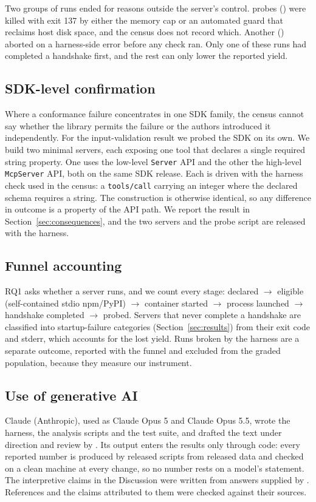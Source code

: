 Two groups of runs ended for reasons outside the server's control. \NKilled{}
probes (\NKilledPct{}) were killed with exit 137 by either the memory cap or an
automated guard that reclaims host disk space, and the census does not record which.
Another \NHarnessError{} (\NHarnessErrorPct{}) aborted on a harness-side error before
any check ran. Only one of these \NInterrupted{} runs had completed a handshake
first, and the rest can only lower the reported yield.

\subsection{SDK-level confirmation}
\label{sec:sdk-probe}
Where a conformance failure concentrates in one SDK family, the census cannot
say whether the library permits the failure or the authors introduced it
independently. For the input-validation result we probed the SDK on its own. We build
two minimal servers, each exposing one tool that declares a single required string
property. One uses the low-level \texttt{Server} API and the other the high-level
\texttt{McpServer} API, both on the same SDK release. Each is driven with the harness
check used in the census: a \texttt{tools/call} carrying an
integer where the declared schema requires a string. The construction is otherwise
identical, so any difference in outcome is a property of the API path. We report the
result in Section~\ref{sec:consequences}, and the two servers and the probe script
are released with the harness.

\subsection{Funnel accounting}
RQ1 asks whether a server runs, and we count every stage:
declared $\rightarrow$ eligible (self-contained stdio npm/PyPI) $\rightarrow$
container started $\rightarrow$ process launched
$\rightarrow$ handshake completed $\rightarrow$ probed. Servers that never complete a
handshake are classified into startup-failure categories
(Section~\ref{sec:results}) from their exit code and stderr, which accounts for the
lost yield.
Runs broken by the harness are a separate outcome, reported with the funnel and
excluded from the graded population, because they measure our instrument.

\subsection{Use of generative AI}\label{sec:genai}
Claude (Anthropic), used as Claude Opus 5 and Claude Opus 5.5, wrote the harness, the
analysis scripts and the test suite, and drafted the text under direction and review
by \theauthor{}. Its output enters the results only through code: every reported
number is produced by released scripts from released data and checked on a clean
machine at every change, so no number rests on a model's statement. The
interpretive claims in the Discussion were written from answers supplied by
\theauthor{}. References and the claims attributed to them were checked against
their sources.
